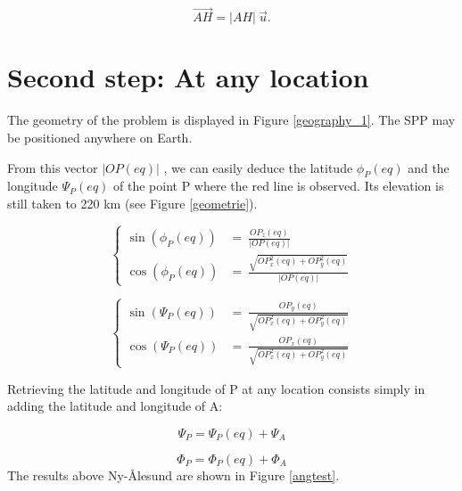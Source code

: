 \documentclass[draft,jgrga]{agutexSI}
\begin{document}
\begin{article}
\begin{equation}
\overrightarrow{AH}=\vert AH \vert\ \overrightarrow{u} 
\label{vectAH}.
\end{equation}

\section{Second step: At any location}
The geometry of the problem is displayed in Figure \ref{geography_1}. The SPP may be positioned anywhere on Earth.

From this vector $\vert OP(eq) \vert$ , we can easily deduce the latitude $\phi_P(eq) $ and the longitude $\Psi_P(eq)$ of the point P where the red line is observed. Its elevation is still taken to 220 km (see Figure \ref{geometrie}).

\begin{equation}
\label{latP}
\left\{ \begin{array}{cc}
\sin(\phi_{P}(eq) ) &=\ \frac{OP_z(eq) }{\vert OP(eq)  \vert} \\
\cos(\phi_{P}(eq) ) &=\ \frac{\sqrt{OP_x^2(eq) +OP_y^2(eq) }}{\vert OP(eq)  \vert} 
\end{array} \right.
\end{equation}

\begin{equation}
\label{longP1}
\left\{ \begin{array}{cc}
\sin(\Psi_{P}(eq)) &=\  \frac{OP_y(eq)}{\sqrt{OP_x^2(eq)+OP_y^2(eq)}} \\
\cos(\Psi_{P}(eq)) &=\  \frac{OP_x(eq)}{\sqrt{OP_x^2(eq)+OP_y^2(eq)}}  
\end{array} \right.
\end{equation}

Retrieving the latitude and longitude of P at any location consists simply in adding the latitude and longitude of A:

\begin{equation}
\label{coordP1}
\Psi_{P} =\Psi_{P}(eq) + \Psi_{A}
\end{equation}

\begin{equation}
\label{coordP2}
\Phi_{P} = \Phi_{P}(eq) + \Phi_{A}  
\end{equation}
The results above Ny-\AA lesund are shown in Figure \ref{angtest}.


\end{article}
\end{document}
